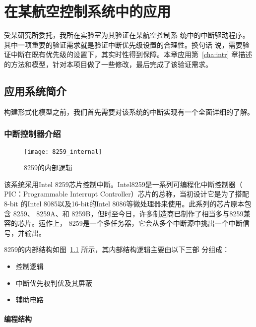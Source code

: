 
\chapter{在某航空控制系统中的应用}
\label{cha:case}

受某研究所委托，我所在实验室为其验证在某航空控制系
统中的中断驱动程序。其中一项重要的验证需求就是验证中断优先级设置的合理性。换句话
说，需要验证中断在既有优先级的设置下，其实时性得到保障。本章应用第~\ref{cha:intr} 
章描述的方法和模型，针对本项目做了一些修改，最后完成了该验证需求。

\section{应用系统简介}
\label{sec:system_intro}

构建形式化模型之前，我们首先需要对该系统的中断实现有一个全面详细的了解。

\subsection{中断控制器介绍}
\label{subsec:8259}

\begin{figure}[H]
	\centering
	\texttt{[image: 8259\_internal]}
	\caption{8259的内部逻辑}
	\label{fig:8259_internal}
\end{figure}

该系统采用Intel 8259芯片控制中断。Intel8259是一系列可编程化中断控制器（
PIC：Programmable Interrupt Controller）芯片的总称，当初设计它是为了搭配 8-bit
的Intel 8085以及16-bit的Intel 8086等微处理器来使用。此系列的芯片原本包含 8259、
8259A、和 8259B，但时至今日，许多制造商已制作了相当多与8259兼容的芯片。运作上，
8259是一个多任务器，它会从多个中断源中挑出一个中断信号，并输出。

8259的内部结构如图~\ref{fig:8259_internal} 所示，其内部结构逻辑主要由以下三部
分组成：

\begin{itemize}
	\item 控制逻辑
	\item 中断优先权判优及其屏蔽
	\item 辅助电路
\end{itemize}

\subsubsection{编程结构}
\label{subsubsec:8259_program}

